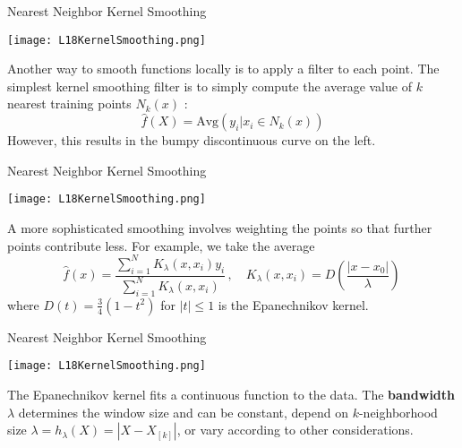 \documentclass[10pt, table, dvipsnames,xcdraw,handout]{beamer}
\begin{document}
\begin{frame}[fragile]{Nearest Neighbor Kernel Smoothing}
  \begin{minipage}[t][0.5\textheight][t]{\textwidth}
	\centering \texttt{[image: L18KernelSmoothing.png]} 
  \end{minipage}
  \vfill
\begin{minipage}[t][0.5\textheight][t]{\textwidth}
Another way to smooth functions locally is to apply a filter to each point. The simplest kernel smoothing filter is to simply compute the average value of $k$ nearest training points $N_k(x)$ :
$$
\hat{f}(X) = \text{Avg}(y_i|x_i\in N_k(x))
$$\pause
However, this results in the bumpy discontinuous curve on the left. 
\end{minipage}
\end{frame}


\begin{frame}[fragile]{Nearest Neighbor Kernel Smoothing}
  \begin{minipage}[t][0.5\textheight][t]{\textwidth}
	\centering \texttt{[image: L18KernelSmoothing.png]} 
  \end{minipage}
  \vfill
\begin{minipage}[t][0.5\textheight][t]{\textwidth}
A more sophisticated smoothing involves weighting the points so that further points contribute less. For example, we take the average
$$
\hat{f}(x) = \frac{\sum_{i=1}^N K_\lambda(x,x_i)y_i}{\sum_{i=1}^N K_\lambda(x,x_i)}\,,\hspace{1em} K_\lambda(x,x_i) = D\left(\frac{|x-x_0|}{\lambda}\right)\,
$$\pause
where $D(t) = \frac34(1-t^2)$ for $|t|\leq1$ is the Epanechnikov kernel. 
\end{minipage}
\end{frame}


\begin{frame}[fragile]{Nearest Neighbor Kernel Smoothing}
  \begin{minipage}[t][0.5\textheight][t]{\textwidth}
	\centering \texttt{[image: L18KernelSmoothing.png]} 
  \end{minipage}
  \vfill
\begin{minipage}[t][0.5\textheight][t]{\textwidth}
The Epanechnikov kernel fits a continuous function to the data. The \textbf{bandwidth} $\lambda$ determines the window size and can be constant, depend on $k$-neighborhood size $\lambda = h_\lambda(X) = |X - X_{[k]}|$, or vary according to other considerations.
\end{minipage}
\end{frame}
\end{document}
